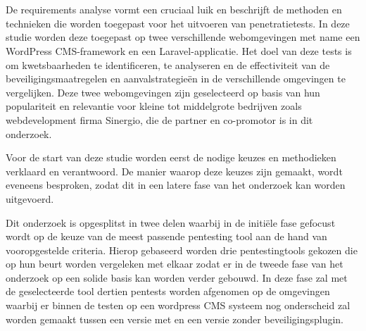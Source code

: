 \section{}
De requirements analyse vormt een cruciaal luik en beschrijft de methoden en technieken die worden toegepast 
voor het uitvoeren van penetratietests. In deze studie worden deze toegepast op twee 
verschillende webomgevingen met name een WordPress CMS-framework en een Laravel-applicatie. Het doel van deze tests is om kwetsbaarheden te identificeren, te 
analyseren en de effectiviteit van de beveiligingsmaatregelen en aanvalstrategieën in de verschillende omgevingen te vergelijken.
Deze twee webomgevingen zijn geselecteerd op basis van hun populariteit en relevantie voor kleine tot middelgrote bedrijven 
zoals webdevelopment firma Sinergio, die de partner en co-promotor is in dit onderzoek.

Voor de start van deze studie worden eerst de nodige keuzes en methodieken verklaard en verantwoord. De manier waarop deze keuzes zijn gemaakt, wordt eveneens 
besproken, zodat dit in een latere fase van het onderzoek kan worden uitgevoerd.

Dit onderzoek is opgesplitst in twee delen waarbij in de initiële fase gefocust wordt op de keuze van de meest passende pentesting tool 
aan de hand van vooropgestelde criteria. Hierop gebaseerd worden drie pentestingtools gekozen die op hun beurt worden vergeleken met elkaar 
zodat er in de tweede fase van het onderzoek op een solide basis kan worden verder gebouwd. In deze fase zal met de geselecteerde 
tool dertien pentests worden afgenomen op de omgevingen waarbij er binnen de testen op een wordpress CMS systeem nog onderscheid zal worden gemaakt 
tussen een versie met en een versie zonder beveiligingsplugin.

